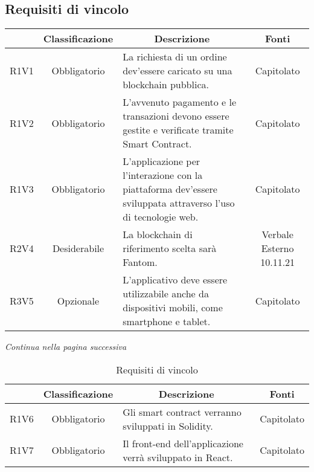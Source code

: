 \subsection{Requisiti di vincolo} \label{subsection:requisiti_vincolo}
\begin{table}[H]
    \centering
    \renewcommand{\arraystretch}{1.8}
    \begin{tabular}{c | c | p{6cm} | c}
        \rowcolor[HTML]{125E28}
        \multicolumn{1}{c}{\color[HTML]{FFFFFF} \textbf{Codice}} & 
		\multicolumn{1}{c}{\color[HTML]{FFFFFF} \textbf{Classificazione}} & 
		\multicolumn{1}{c}{\color[HTML]{FFFFFF} \textbf{Descrizione}} & 
		\multicolumn{1}{c}{\color[HTML]{FFFFFF} \textbf{Fonti}} \\
        \hline
		R1V1 & Obbligatorio & La richiesta di un ordine dev'essere caricato su una blockchain pubblica. & Capitolato \\
        R1V2 & Obbligatorio & L'avvenuto pagamento e le transazioni devono essere gestite e verificate tramite Smart Contract. & Capitolato \\
        R1V3 & Obbligatorio & L'applicazione per l'interazione con la piattaforma dev'essere sviluppata attraverso l'uso di tecnologie web. & Capitolato \\ 
        R2V4 & Desiderabile & La blockchain di riferimento scelta sarà Fantom. & Verbale Esterno 10.11.21 \\
        R3V5 & Opzionale & L'applicativo deve essere utilizzabile anche da dispositivi mobili, come smartphone e tablet. & Capitolato \\                       
    \end{tabular}
\end{table}
\begin{center}
    \textit{\small Continua nella pagina successiva}
\end{center}
\begin{table}[H]
    \centering
    \renewcommand{\arraystretch}{1.8}
    \begin{tabular}{c | c | p{6cm} | c}
        \rowcolor[HTML]{125E28} 
        \multicolumn{1}{c}{\color[HTML]{FFFFFF} \textbf{Codice}} & 
		\multicolumn{1}{c}{\color[HTML]{FFFFFF} \textbf{Classificazione}} & 
		\multicolumn{1}{c}{\color[HTML]{FFFFFF} \textbf{Descrizione}} & 
		\multicolumn{1}{c}{\color[HTML]{FFFFFF} \textbf{Fonti}} \\
        \hline
        R1V6 & Obbligatorio & Gli smart contract verranno sviluppati in Solidity. & Capitolato \\
        R1V7 & Obbligatorio & Il front-end dell'applicazione verrà sviluppato in React. & Capitolato \\ 
    \end{tabular}
    \caption{Requisiti di vincolo}
\end{table}

